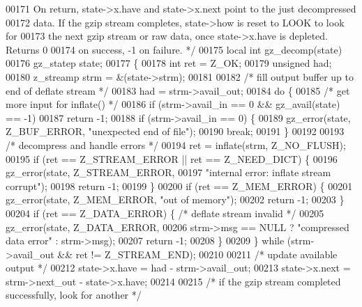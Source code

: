 \begin{DoxyCode}
00171 \textcolor{comment}{   On return, state->x.have and state->x.next point to the just decompressed}
00172 \textcolor{comment}{   data.  If the gzip stream completes, state->how is reset to LOOK to look for}
00173 \textcolor{comment}{   the next gzip stream or raw data, once state->x.have is depleted.  Returns 0}
00174 \textcolor{comment}{   on success, -1 on failure. */}
00175 local \textcolor{keywordtype}{int} gz\_decomp(state)
00176     gz\_statep state;
00177 \{
00178     \textcolor{keywordtype}{int} ret = Z\_OK;
00179     \textcolor{keywordtype}{unsigned} had;
00180     z\_streamp strm = &(state->strm);
00181 
00182     \textcolor{comment}{/* fill output buffer up to end of deflate stream */}
00183     had = strm->avail\_out;
00184     \textcolor{keywordflow}{do} \{
00185         \textcolor{comment}{/* get more input for inflate() */}
00186         \textcolor{keywordflow}{if} (strm->avail\_in == 0 && gz\_avail(state) == -1)
00187             \textcolor{keywordflow}{return} -1;
00188         \textcolor{keywordflow}{if} (strm->avail\_in == 0) \{
00189             gz\_error(state, Z\_BUF\_ERROR, \textcolor{stringliteral}{"unexpected end of file"});
00190             \textcolor{keywordflow}{break};
00191         \}
00192 
00193         \textcolor{comment}{/* decompress and handle errors */}
00194         ret = inflate(strm, Z\_NO\_FLUSH);
00195         \textcolor{keywordflow}{if} (ret == Z\_STREAM\_ERROR || ret == Z\_NEED\_DICT) \{
00196             gz\_error(state, Z\_STREAM\_ERROR,
00197                      \textcolor{stringliteral}{"internal error: inflate stream corrupt"});
00198             \textcolor{keywordflow}{return} -1;
00199         \}
00200         \textcolor{keywordflow}{if} (ret == Z\_MEM\_ERROR) \{
00201             gz\_error(state, Z\_MEM\_ERROR, \textcolor{stringliteral}{"out of memory"});
00202             \textcolor{keywordflow}{return} -1;
00203         \}
00204         \textcolor{keywordflow}{if} (ret == Z\_DATA\_ERROR) \{              \textcolor{comment}{/* deflate stream invalid */}
00205             gz\_error(state, Z\_DATA\_ERROR,
00206                      strm->msg == NULL ? \textcolor{stringliteral}{"compressed data error"} : strm->msg);
00207             \textcolor{keywordflow}{return} -1;
00208         \}
00209     \} \textcolor{keywordflow}{while} (strm->avail\_out && ret != Z\_STREAM\_END);
00210 
00211     \textcolor{comment}{/* update available output */}
00212     state->x.have = had - strm->avail\_out;
00213     state->x.next = strm->next\_out - state->x.have;
00214 
00215     \textcolor{comment}{/* if the gzip stream completed successfully, look for another */}

\end{DoxyCode}
